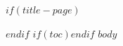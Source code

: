 \documentclass[$papersize$,$if(onecolumn)$onecolumn$else$twocolumn$endif$,openany,bg=$background$$if(justified)$,justified$endif$]{dndbook}
\date{}
\begin{document}
$if(title-page)$\maketitle$endif$
$if(toc)$\tableofcontents$endif$
$body$
\end{document}
